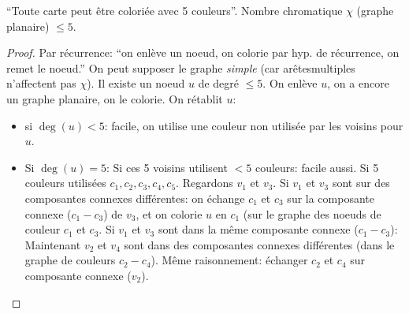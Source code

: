 \begin{mytheo}
  ``Toute carte peut être coloriée avec 5 couleurs''.
  Nombre chromatique $\chi$ (graphe planaire) $\leq 5$.
  \begin{proof}
    Par récurrence: ``on enlève un noeud, on colorie par hyp. de récurrence, on remet le noeud.''
    On peut supposer le graphe \emph{simple} (car arêtesmultiples n'affectent pas $\chi$).
    Il existe un noeud $u$ de degré $\leq 5$.
    On enlève $u$, on a encore un graphe planaire, on le colorie.
    On rétablit $u$:
    \begin{itemize}
      \item si $\deg(u) < 5$: facile, on utilise une couleur non utilisée par les voisins pour $u$.
      \item Si $\deg(u) = 5$: Si ces 5 voisins utilisent $< 5$ couleurs: facile aussi.
        Si 5 couleurs utilisées $c_1, c_2, c_3, c_4, c_5$.
        Regardons $v_1$ et $v_3$. Si $v_1$ et $v_3$ sont sur des composantes connexes différentes: on échange $c_1$ et $c_3$ sur
        la composante connexe ($c_1-c_3$) de $v_3$, et on colorie $u$ en $c_1$ (sur le graphe des noeuds de couleur $c_1$ et $c_3$.
        Si $v_1$ et $v_3$ sont dans la même composante connexe ($c_1-c_3$):
        Maintenant $v_2$ et $v_4$ sont dans des composantes connexes
        différentes (dans le graphe de couleurs $c_2-c_4$).
        Même raisonnement: échanger $c_2$ et $c_4$ sur composante connexe ($v_2$).
    \end{itemize}
  \end{proof}
\end{mytheo}
